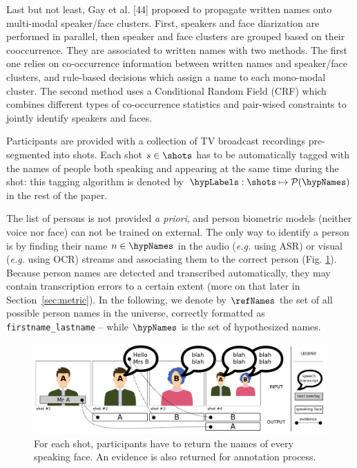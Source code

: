 Last but not least, Gay et al. [44] proposed to propagate written names onto multi-modal speaker/face clusters. First,
speakers and face diarization are performed in parallel, then speaker and face clusters are grouped based on their cooccurrence. They are associated to written names with two methods. The first one relies on co-occurrence information between written names and speaker/face clusters, and rule-based decisions which assign a name to each mono-modal cluster. The second method uses a Conditional Random Field (CRF)
which combines different types of co-occurrence statistics and pair-wised constraints to jointly identify speakers and faces.

 Participants are provided with a collection of TV broadcast recordings pre-segmented into shots.
Each shot $s \in \shots$ has to be automatically tagged with the names of people both speaking and appearing at the same time during the shot: this tagging algorithm is denoted by $\hypLabels : \shots \mapsto \mathcal{P}(\hypNames)$ in the rest of the paper.

The list of persons is not provided \emph{a priori}, and person biometric models (neither voice nor face) can not be trained on external. The only way to identify a person is by finding their name $n \in \hypNames$ in the audio (\emph{e.g.} using ASR) or visual (\emph{e.g.} using OCR) streams and associating them to the correct person (Fig. \ref{fig:evidence}). %
Because person names are detected and transcribed automatically, they may contain transcription errors to a certain extent (more on that later in Section~\ref{sec:metric}). In the following, we denote by $\refNames$ the set of all possible person names in the universe, correctly formatted as \texttt{firstname\_lastname} -- while $\hypNames$ is the set of hypothesized names.

\begin{figure}[!htb]
 \centering
 \includegraphics[width=1.\linewidth]{evidence.pdf}

 \caption{For each shot, participants have to return the names of every speaking face. An evidence is also returned for annotation process.}
 \label{fig:evidence}
\end{figure}

